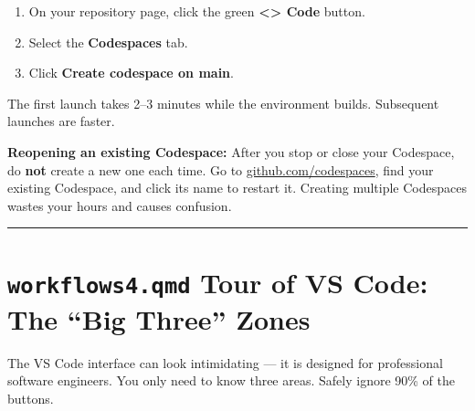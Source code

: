 \documentclass[
  letterpaper,
  DIV=11,
  numbers=noendperiod,
  oneside]{scrreprt}
\providecommand{\tightlist}{%
  \setlength{\itemsep}{0pt}\setlength{\parskip}{0pt}}
\begin{document}

\begin{enumerate}
\def\labelenumi{\arabic{enumi}.}
\tightlist
\item
  On your repository page, click the green
  \textbf{\textless\textgreater{} Code} button.
\item
  Select the \textbf{Codespaces} tab.
\item
  Click \textbf{Create codespace on main}.
\end{enumerate}

The first launch takes 2--3 minutes while the environment builds.
Subsequent launches are faster.

\begin{tcolorbox}[enhanced jigsaw, opacitybacktitle=0.6, colbacktitle=quarto-callout-note-color!10!white, breakable, opacityback=0, coltitle=black, toptitle=1mm, bottomrule=.15mm, colframe=quarto-callout-note-color-frame, bottomtitle=1mm, colback=white, leftrule=.75mm, rightrule=.15mm, title=\textcolor{quarto-callout-note-color}{\faInfo}\hspace{0.5em}{Note}, left=2mm, arc=.35mm, toprule=.15mm, titlerule=0mm]

\textbf{Reopening an existing Codespace:} After you stop or close your
Codespace, do \textbf{not} create a new one each time. Go to
\href{https://github.com/codespaces}{github.com/codespaces}, find your
existing Codespace, and click its name to restart it. Creating multiple
Codespaces wastes your hours and causes confusion.

\end{tcolorbox}

\begin{center}\rule{0.5\linewidth}{0.5pt}\end{center}

\section*{\texorpdfstring{\texttt{workflows4.qmd} Tour of VS Code: The
``Big Three''
Zones}{workflows4.qmd Tour of VS Code: The ``Big Three'' Zones}}\label{workflows4.qmd-tour-of-vs-code-the-big-three-zones}


The VS Code interface can look intimidating --- it is designed for
professional software engineers. You only need to know three areas.
Safely ignore 90\% of the buttons.
\end{document}

